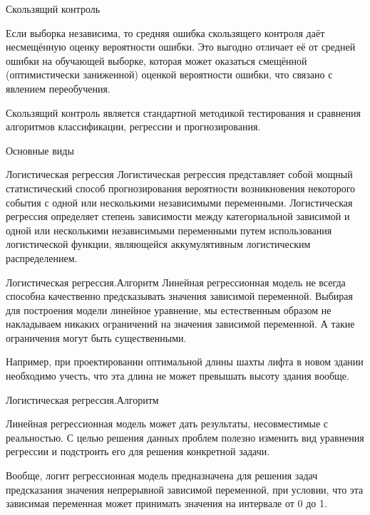 \documentclass[10pt,pdf,hyperref={unicode}]{beamer}
\begin{document}
\begin{frame}{Скользящий контроль}

Если выборка независима, то средняя ошибка скользящего контроля даёт несмещённую оценку вероятности ошибки. 
Это выгодно отличает её от средней ошибки на обучающей выборке, которая может оказаться смещённой 
(оптимистически заниженной) оценкой вероятности ошибки, что связано с явлением переобучения.

Скользящий контроль является стандартной методикой тестирования и сравнения алгоритмов классификации, регрессии и прогнозирования. 

\end{frame}


\begin{frame}{Основные виды}

\end{frame}




\begin{frame}{Логистическая регрессия}
Логистическая регрессия представляет собой мощный статистический способ прогнозирования вероятности возникновения 
некоторого события с одной или несколькими независимыми переменными.
 Логистическая регрессия определяет степень зависимости между категориальной зависимой и одной или несколькими 
 независимыми переменными путем использования логистической функции, являющейся аккумулятивным логистическим распределением. 

\end{frame}




\begin{frame}{Логистическая регрессия.Алгоритм}
Линейная регрессионная модель не всегда способна качественно предсказывать значения зависимой переменной. Выбирая для построения модели линейное уравнение, мы естественным 
образом не накладываем никаких ограничений на значения зависимой переменной. А такие ограничения могут быть существенными.

Например, при проектировании оптимальной длины шахты лифта в новом здании необходимо учесть, что эта длина не может превышать высоту здания вообще.
\end{frame}


\begin{frame}{Логистическая регрессия.Алгоритм}

Линейная регрессионная модель может дать результаты, несовместимые с реальностью. С целью решения данных проблем полезно изменить 
вид уравнения регрессии и подстроить его для решения конкретной задачи.

Вообще, логит регрессионная модель предназначена для решения задач предсказания 
значения непрерывной зависимой переменной, при условии, что эта зависимая переменная 
может принимать значения на интервале от 0 до 1.
\end{frame}
\end{document}
